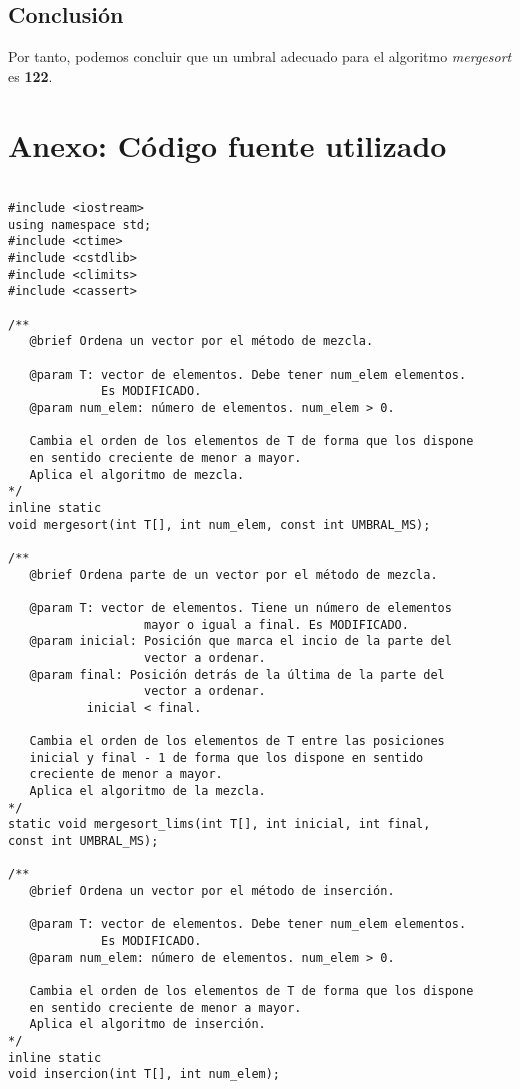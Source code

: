 \documentclass[12pt,spanish]{article}
\begin{document}
\subsection{Conclusión}
Por tanto, podemos concluir que un umbral adecuado para el algoritmo \emph{mergesort} es \textbf{122}.


\section{Anexo: Código fuente utilizado}
\begin{verbatim}

#include <iostream>
using namespace std;
#include <ctime>
#include <cstdlib>
#include <climits>
#include <cassert>

/**
   @brief Ordena un vector por el método de mezcla.

   @param T: vector de elementos. Debe tener num_elem elementos.
             Es MODIFICADO.
   @param num_elem: número de elementos. num_elem > 0.

   Cambia el orden de los elementos de T de forma que los dispone
   en sentido creciente de menor a mayor.
   Aplica el algoritmo de mezcla.
*/
inline static
void mergesort(int T[], int num_elem, const int UMBRAL_MS);

/**
   @brief Ordena parte de un vector por el método de mezcla.

   @param T: vector de elementos. Tiene un número de elementos
                   mayor o igual a final. Es MODIFICADO.
   @param inicial: Posición que marca el incio de la parte del
                   vector a ordenar.
   @param final: Posición detrás de la última de la parte del
                   vector a ordenar.
		   inicial < final.

   Cambia el orden de los elementos de T entre las posiciones
   inicial y final - 1 de forma que los dispone en sentido 
   creciente de menor a mayor.
   Aplica el algoritmo de la mezcla.
*/
static void mergesort_lims(int T[], int inicial, int final, 
const int UMBRAL_MS);

/**
   @brief Ordena un vector por el método de inserción.

   @param T: vector de elementos. Debe tener num_elem elementos.
             Es MODIFICADO.
   @param num_elem: número de elementos. num_elem > 0.

   Cambia el orden de los elementos de T de forma que los dispone
   en sentido creciente de menor a mayor.
   Aplica el algoritmo de inserción.
*/
inline static
void insercion(int T[], int num_elem);


\end{verbatim}
\end{document}
